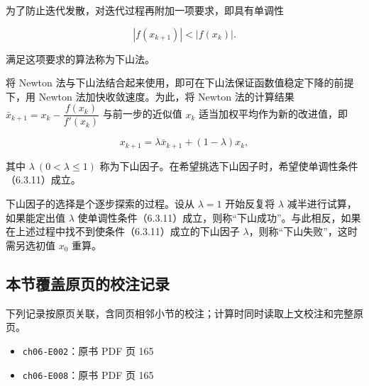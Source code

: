 \documentclass[
  10pt,
  fontset=fandol]{ctexart}
\providecommand{\tightlist}{%
  \setlength{\itemsep}{0pt}\setlength{\parskip}{0pt}}
\begin{document}
为了防止迭代发散，对迭代过程再附加一项要求，即具有单调性

\[
|f(x_{k+1})|<|f(x_k)|.
\tag{6.3.11}
\]

满足这项要求的算法称为下山法。

将 Newton 法与下山法结合起来使用，即可在下山法保证函数值稳定下降的前提下，用 Newton 法加快收敛速度。为此，将 Newton 法的计算结果 \(\bar{x}_{k+1}=x_k-\dfrac{f(x_k)}{f'(x_k)}\) 与前一步的近似值 \(x_k\) 适当加权平均作为新的改进值，即

\[
x_{k+1}=\lambda\bar{x}_{k+1}+(1-\lambda)x_k,
\tag{6.3.12}
\]

其中 \(\lambda\ (0<\lambda\leqslant1)\) 称为下山因子。在希望挑选下山因子时，希望使单调性条件（6.3.11）成立。

下山因子的选择是个逐步探索的过程。设从 \(\lambda=1\) 开始反复将 \(\lambda\) 减半进行试算，如果能定出值 \(\lambda\) 使单调性条件（6.3.11）成立，则称``下山成功''。与此相反，如果在上述过程中找不到使条件（6.3.11）成立的下山因子 \(\lambda\)，则称``下山失败''，这时需另选初值 \(x_0\) 重算。

\subsection{本节覆盖原页的校注记录}\label{ux672cux8282ux8986ux76d6ux539fux9875ux7684ux6821ux6ce8ux8bb0ux5f55}

下列记录按原页关联，含同页相邻小节的校注；计算时同时读取上文校注和完整原页。

\begin{itemize}
\tightlist
\item
  \texttt{ch06-E002}：原书 PDF 页 165
\item
  \texttt{ch06-E008}：原书 PDF 页 165
\end{itemize}
\end{document}
